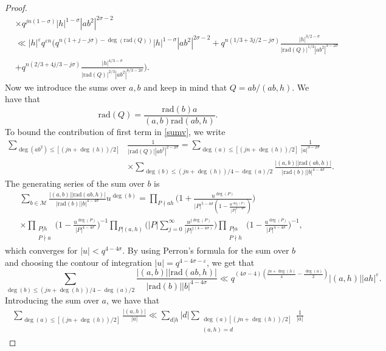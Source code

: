 \documentclass[12pt]{amsart}
\begin{document}
\begin{proof}
\begin{align}
 & \times q^{jn(1-\sigma)} |h|^{1-\sigma} |ab^2|^{2\sigma-2} \nonumber \\
 & \ll |h|^{\varepsilon} q^{\varepsilon n} \Bigg(q^{n(1+j-j\sigma)-\deg(\text{rad}(Q))} |h|^{1-\sigma} |ab^2|^{2\sigma-2} + q^{n (1/3+3j/2-j \sigma)} \frac{|h|^{3/2-\sigma}}{|\text{rad}(Q)|^{1/3} |ab^2|^{3-2\sigma}} \nonumber\\
 & +q^{n(2/3+4j/3-j \sigma)} \frac{|h|^{4/3-\sigma}}{|\text{rad}(Q)|^{2/3}|ab^2|^{8/3-2\sigma}}\Bigg). \label{sumv}
\end{align} 
 Now we introduce the sums over $a,b$ and keep in mind that $Q=ab/(ab,h)$. We have that
 $$\text{rad}(Q) = \frac{\text{rad}(b) a }{(a,b) \text{rad}(ab,h)}.$$
  To bound the contribution of first term in \eqref{sumv}, we write
  \begin{align*} \sum_{\deg(ab^2) \leq [(jn+\deg(h))/2]}& \frac{1}{|\text{rad}(Q)| |ab^2|^{2-2\sigma}} =  \sum_{\deg(a) \leq  [(jn+\deg(h))/2]} \frac{1}{|a|^{3-2\sigma}}\\
 & \times \sum_{\deg(b) \leq (jn+\deg(h))/4-\deg(a)/2} \frac{|(a,b)| |\text{rad}(ab,h)|}{|\text{rad}(b)| |b|^{4-4\sigma}}.
 \end{align*}
 The generating series of the sum over $b$ is
 \begin{align*}
& \sum_{b \in \mathcal{M}}  \frac{|(a,b)| |\text{rad}(ab,h)|}{|\text{rad}(b)| |b|^{4-4\sigma}} u^{\deg(b)} = \prod_{P \nmid ah} \Big(  1+ \frac{u^{\deg(P)}}{|P|^{5-4\sigma} ( 1- \frac{u^{\deg(P)}}{|P|^{4-4\sigma}})}\Big) \\
 & \times \prod_{\substack{P|h \\ P \nmid a}} \Big( 1-\frac{u^{\deg(P)}}{|P|^{4-4\sigma}}\Big)^{-1} \prod_{P|(a,h)} \Big(|P|\sum_{j=0}^{\infty} \frac{ u^{j\deg(P)} }{|P|^{j(4-4\sigma)}} \Big)  \prod_{\substack{P | a \\ P \nmid h}}  \Big( 1-\frac{u^{\deg(P)}}{|P|^{4-4\sigma}}\Big)^{-1},
 \end{align*}
which converges for $|u|<q^{4-4\sigma}$. By using Perron's formula for the sum over $b$ and choosing the contour of integration $|u|=q^{4-4\sigma-\varepsilon}$, we get that
 $$  \sum_{\deg(b) \leq (jn+\deg(h))/4-\deg(a)/2} \frac{|(a,b)| |\text{rad}(ab,h)|}{|\text{rad}(b)| |b|^{4-4\sigma}} \ll q^{(4\sigma-4)( \frac{jn+\deg(h)}{4}-\frac{\deg(a)}{2})} |(a,h)| |ah|^{\varepsilon}.$$
 Introducing the sum over $a$, we have that 
 \begin{align*}
  \sum_{\deg(a) \leq  [(jn+\deg(h))/2]} \frac{|(a,h)|}{|a|}
  \ll \sum_{d|h} |d| \sum_{\substack{\deg(a)  [(jn+\deg(h))/2] \\ (a,h)=d}} \frac{1}{|a|}

\end{align*}
\end{proof}
\end{document}
